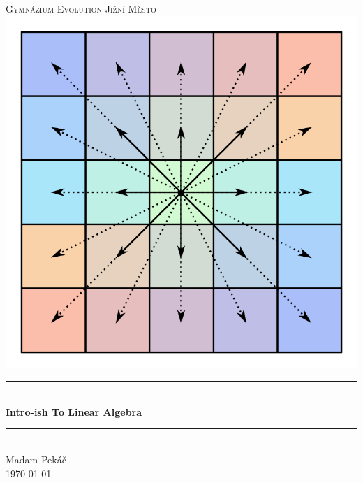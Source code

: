 \begin{titlepage}
 \newcommand{\HRule}{\rule{\linewidth}{0.5mm}}
 \center
 \textsc{\LARGE
  Gymnázium Evolution Jižní Město
 } \\[1cm]
 \includegraphics[width=.5\textwidth]{grid.png} \\[1cm]
 \HRule \\[0.4cm]
 { \huge \sffamily \bfseries Intro-ish To Linear Algebra\\[0.4cm] }
 \HRule \\[1.5cm]
 \large Madam Pekáč
 \\[1cm]
 \large \today \\ [1cm]
\end{titlepage}

